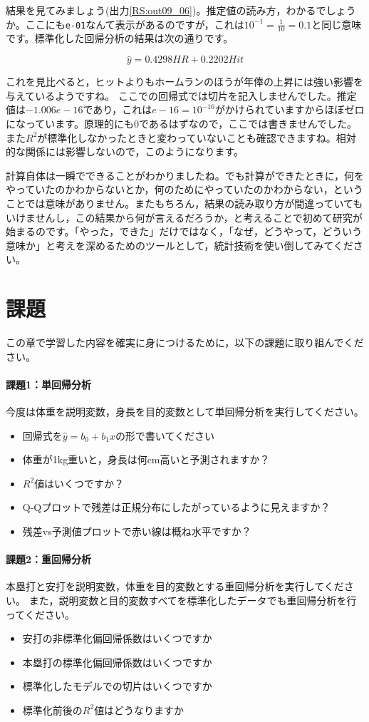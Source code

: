 \documentclass{ltjsbook}
\begin{document}
結果を見てみましょう(出力\ref{RS:out09_06})。推定値の読み方，わかるでしょうか。ここにも\verb|e-01|なんて表示があるのですが，これは$10^{-1}=\frac{1}{10}=0.1$と同じ意味です。標準化した回帰分析の結果は次の通りです。

\[ \hat{y} = 0.4298 HR + 0.2202 Hit \]

これを見比べると，ヒットよりもホームランのほうが年俸の上昇には強い影響を与えているようですね。
ここでの回帰式では切片を記入しませんでした。推定値は$-1.006e-16$であり，これは$e-16=10^{-16}$がかけられていますからほぼゼロになっています。原理的にも$0$であるはずなので，ここでは書きませんでした。
また$R^2$が標準化しなかったときと変わっていないことも確認できますね。相対的な関係には影響しないので，このようになります。

計算自体は一瞬でできることがわかりましたね。でも計算ができたときに，何をやっていたのかわからないとか，何のためにやっていたのかわからない，ということでは意味がありません。またもちろん，結果の読み取り方が間違っていてもいけませんし，この結果から何が言えるだろうか，と考えることで初めて研究が始まるのです。「やった，できた」だけではなく，「なぜ，どうやって，どういう意味か」と考えを深めるためのツールとして，統計技術を使い倒してみてください。

\section{課題}
この章で学習した内容を確実に身につけるために，以下の課題に取り組んでください。

\paragraph{課題1：単回帰分析}
今度は体重を説明変数，身長を目的変数として単回帰分析を実行してください。
\begin{itemize}
    \item 回帰式を$\hat{y} = b_0 + b_1x$の形で書いてください
    \item 体重が1kg重いと，身長は何cm高いと予測されますか？
    \item $R^2$値はいくつですか？
    \item Q-Qプロットで残差は正規分布にしたがっているように見えますか？
    \item 残差vs予測値プロットで赤い線は概ね水平ですか？
\end{itemize}

\paragraph{課題2：重回帰分析}
本塁打と安打を説明変数，体重を目的変数とする重回帰分析を実行してください。
また，説明変数と目的変数すべてを標準化したデータでも重回帰分析を行ってください。

\begin{itemize}
    \item 安打の非標準化偏回帰係数はいくつですか
    \item 本塁打の標準化偏回帰係数はいくつですか
    \item 標準化したモデルでの切片はいくつですか
    \item 標準化前後の$R^2$値はどうなりますか
\end{itemize}
\end{document}
